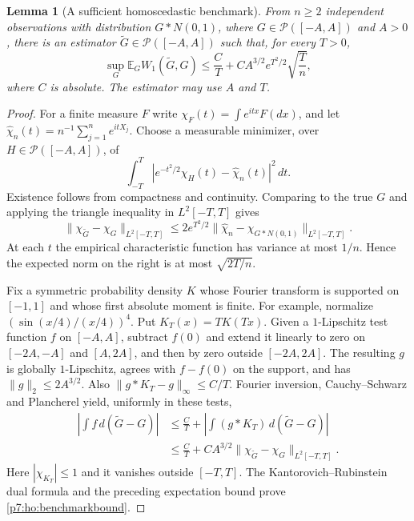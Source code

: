 \documentclass[11pt,a4paper]{article}
\newtheorem{lemma}[theorem]{Lemma}
\theoremstyle{definition}
\theoremstyle{remark}
\numberwithin{equation}{section}
\begin{document}
\begin{lemma}[A sufficient homoscedastic benchmark]\label{p7:ho:benchmark}
From $n\ge2$ independent observations with distribution $G*N(0,1)$,
where $G\in\mathcal P([-A,A])$ and $A>0$, there is an estimator
$\widetilde G\in\mathcal P([-A,A])$ such that, for every $T>0$,
\begin{equation}\label{p7:ho:benchmarkbound}
 \sup_G\mathbb E_G W_1(\widetilde G,G)
 \le \frac C T+C A^{3/2}e^{T^2/2}\sqrt{\frac T n},
\end{equation}
where $C$ is absolute.  The estimator may use $A$ and $T$.
\end{lemma}

\begin{proof}
For a finite measure $F$ write $\chi_F(t)=\int e^{itx}F(dx)$, and let
$\widehat\chi_n(t)=n^{-1}\sum_{j=1}^n e^{itX_j}$.  Choose a measurable
minimizer, over $H\in\mathcal P([-A,A])$, of
\[
 \int_{-T}^T
       |e^{-t^2/2}\chi_H(t)-\widehat\chi_n(t)|^2\,dt.
\]
Existence follows from compactness and continuity.  Comparing to the
true $G$ and applying the triangle inequality in $L^2[-T,T]$ gives
\[
 \|\chi_{\widetilde G}-\chi_G\|_{L^2[-T,T]}
 \le 2e^{T^2/2}
          \|\widehat\chi_n-\chi_{G*N(0,1)}\|_{L^2[-T,T]}.
\]
At each $t$ the empirical characteristic function has variance at
most $1/n$.  Hence the expected norm on the right is at most
$\sqrt{2T/n}$.

Fix a symmetric probability density $K$ whose Fourier transform is
supported on $[-1,1]$ and whose first absolute moment is finite.
For example, normalize $(\sin(x/4)/(x/4))^4$.  Put
$K_T(x)=TK(Tx)$.  Given a $1$-Lipschitz test function $f$ on $[-A,A]$,
subtract $f(0)$ and extend it linearly to zero on $[-2A,-A]$ and
$[A,2A]$, and then by zero outside $[-2A,2A]$.  The resulting $g$
is globally $1$-Lipschitz, agrees with $f-f(0)$ on the support, and
has $\|g\|_2\le2A^{3/2}$.  Also
$\|g*K_T-g\|_\infty\le C/T$.
Fourier inversion, Cauchy--Schwarz and Plancherel yield, uniformly in
these tests,
\begin{align*}
 \left|\int f\,d(\widetilde G-G)\right|
 &\le \frac C T+
       \left|\int(g*K_T)\,d(\widetilde G-G)\right|\\
 &\le \frac C T+
       C A^{3/2}
       \|\chi_{\widetilde G}-\chi_G\|_{L^2[-T,T]}.
\end{align*}
Here $|\chi_{K_T}|\le1$ and it vanishes outside $[-T,T]$.
The Kantorovich--Rubinstein dual formula and the preceding expectation
bound prove \eqref{p7:ho:benchmarkbound}.
\end{proof}
\end{document}

